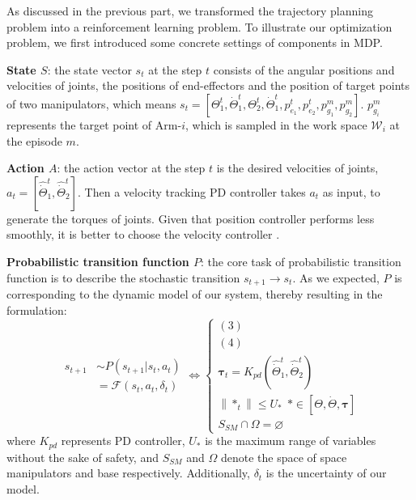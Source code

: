 \documentclass{article}
\begin{document}
As discussed in the previous part, we transformed the trajectory planning problem into a reinforcement learning problem. To illustrate our optimization problem, we first introduced some concrete settings of components in MDP.

\textbf{State $S$}: the state vector $s_t$ at the step $t$ consists of the angular positions and velocities of joints, the positions of end-effectors and the position of target points of two manipulators, which means $s_t = [\Theta^t_1,\dot \Theta^t_1, \Theta^t_2, \dot\Theta^t_1, p^t_{e_1},p^t_{e_2},p^m_{g_1},p^m_{g_2}]$.  $p^m_{g_i}$ represents the target point of Arm-$i$, which is sampled in the work space $\mathcal W_i$  at the episode $m$. 

\textbf{Action $A$}: the action vector at the step $t$ is the desired velocities of joints, $a_t = [\hat{\dot {\Theta}}^t_1,\hat{\dot {\Theta}}^t_2]$.  Then a velocity tracking PD controller takes $a_t$ as input, to generate the torques of joints. Given that position controller performs less smoothly, it is better to choose the velocity controller \cite{Wang20221multi}.

\textbf{Probabilistic transition function $P$}: the core task of probabilistic transition function is to describe the stochastic transition  $s_{t+1} \rightarrow s_t$. As we expected, $P$ is corresponding to the dynamic model of our system, thereby resulting in the formulation: 
\begin{equation}
  \label{eq6}
\begin {aligned} s_{t+1} &\sim P (s_{t+1}|s_t,a_t) \\  &= \mathcal {F}(s_t,a_t,\delta_t) \end{aligned} \Leftrightarrow \begin{cases}
(3) \\
(4) \\
\mathbf \tau_t = K_{pd}(\hat{\dot {\Theta}}^t_1,\hat{\dot {\Theta}}^t_2) \\
\left\|*_{t}\right\| \leq U_{*} \ \ *\in [\Theta,\dot{\Theta},\boldsymbol{\tau}]\\
S_{SM} \cap \Omega =\varnothing
\end{cases}
\end{equation}
where $K_{pd}$ represents PD controller, $U_*$ is the maximum range of variables without the sake of safety, and $S_{SM}$ and $\Omega$ denote the space of space manipulators and base respectively. Additionally, $\delta_t$ is the uncertainty of our model. 
\end{document}
